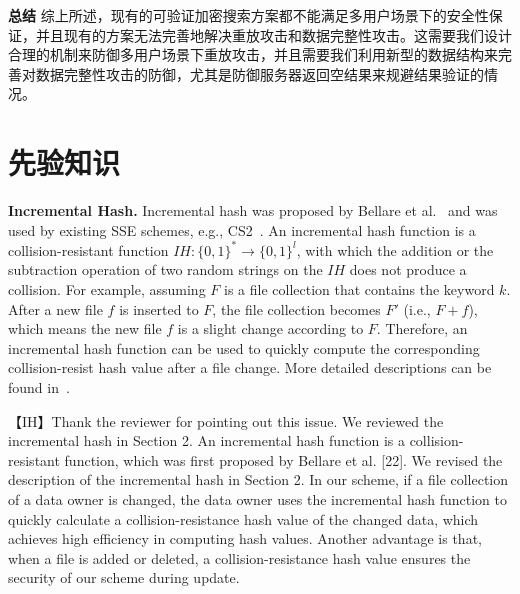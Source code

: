 \noindent\textbf{总结}
	综上所述，现有的可验证加密搜索方案都不能满足多用户场景下的安全性保证，并且现有的方案无法完善地解决重放攻击和数据完整性攻击。这需要我们设计合理的机制来防御多用户场景下重放攻击，并且需要我们利用新型的数据结构来完善对数据完整性攻击的防御，尤其是防御服务器返回空结果来规避结果验证的情况。






\section{先验知识}

\noindent\textbf{Incremental Hash.} Incremental hash was proposed by Bellare et al.~\cite{bellare1994incremental} and was used by existing SSE schemes, e.g., CS2~\cite{kamara2011cs2}. An incremental hash function is a collision-resistant function $IH: \{0,1\}^* \rightarrow \{0,1\}^l$, with which the addition or the subtraction operation of two random strings on the $IH$ does not produce a collision. For example, assuming $F$ is a file collection that contains the keyword $k$. After a new file $f$ is inserted to $F$, the file collection becomes $F'$ (i.e., $F+f$), which means the new file $f$ is a slight change according to $F$.  Therefore, an incremental hash function can be used to quickly compute the corresponding collision-resist hash value after a file change. More detailed descriptions can be found in~\cite{kamara2011cs2}.


【IH】Thank the reviewer for pointing out this issue. We reviewed the incremental hash in Section 2. An incremental hash function is a collision-resistant function, which was first proposed by Bellare et al. [22]. We revised the description of the incremental hash in Section 2.
In our scheme, if a file collection of a data owner is changed, the data owner uses the incremental hash function to quickly calculate a collision-resistance hash value of the changed data, which achieves high efficiency in computing hash values. Another advantage is that, when a file is added or deleted, a collision-resistance hash value ensures the security of our scheme during update.

